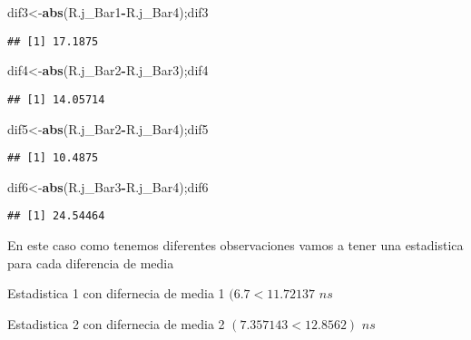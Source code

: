 \documentclass[
]{article}
\newenvironment{Shaded}{\begin{snugshade}}{\end{snugshade}}
\newcommand{\FunctionTok}[1]{\textcolor[rgb]{0.13,0.29,0.53}{\textbf{#1}}}
\newcommand{\NormalTok}[1]{#1}
\newcommand{\OtherTok}[1]{\textcolor[rgb]{0.56,0.35,0.01}{#1}}
\newcommand{\SpecialCharTok}[1]{\textcolor[rgb]{0.81,0.36,0.00}{\textbf{#1}}}
\begin{document}
\begin{Shaded}
\begin{Highlighting}[]
\NormalTok{dif3}\OtherTok{\textless{}{-}}\FunctionTok{abs}\NormalTok{(R.j\_Bar1}\SpecialCharTok{{-}}\NormalTok{R.j\_Bar4);dif3}
\end{Highlighting}
\end{Shaded}

\begin{verbatim}
## [1] 17.1875
\end{verbatim}

\begin{Shaded}
\begin{Highlighting}[]
\NormalTok{dif4}\OtherTok{\textless{}{-}}\FunctionTok{abs}\NormalTok{(R.j\_Bar2}\SpecialCharTok{{-}}\NormalTok{R.j\_Bar3);dif4}
\end{Highlighting}
\end{Shaded}

\begin{verbatim}
## [1] 14.05714
\end{verbatim}

\begin{Shaded}
\begin{Highlighting}[]
\NormalTok{dif5}\OtherTok{\textless{}{-}}\FunctionTok{abs}\NormalTok{(R.j\_Bar2}\SpecialCharTok{{-}}\NormalTok{R.j\_Bar4);dif5}
\end{Highlighting}
\end{Shaded}

\begin{verbatim}
## [1] 10.4875
\end{verbatim}

\begin{Shaded}
\begin{Highlighting}[]
\NormalTok{dif6}\OtherTok{\textless{}{-}}\FunctionTok{abs}\NormalTok{(R.j\_Bar3}\SpecialCharTok{{-}}\NormalTok{R.j\_Bar4);dif6}
\end{Highlighting}
\end{Shaded}

\begin{verbatim}
## [1] 24.54464
\end{verbatim}

En este caso como tenemos diferentes observaciones vamos a tener una
estadistica para cada diferencia de media

Estadistica 1 con difernecia de media 1 \((6.7<11.72137\) \(ns\)

Estadistica 2 con difernecia de media 2 \((7.357143<12.8562)\) \(ns\)
\end{document}
